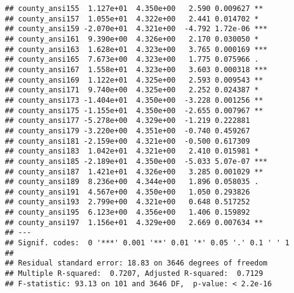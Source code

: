 \documentclass[
]{book}
\newenvironment{Shaded}{\begin{snugshade}}{\end{snugshade}}
\newcommand{\AttributeTok}[1]{\textcolor[rgb]{0.77,0.63,0.00}{#1}}
\newcommand{\FunctionTok}[1]{\textcolor[rgb]{0.00,0.00,0.00}{#1}}
\newcommand{\NormalTok}[1]{#1}
\newcommand{\OtherTok}[1]{\textcolor[rgb]{0.56,0.35,0.01}{#1}}
\newcommand{\SpecialCharTok}[1]{\textcolor[rgb]{0.00,0.00,0.00}{#1}}
\newcommand{\StringTok}[1]{\textcolor[rgb]{0.31,0.60,0.02}{#1}}
\begin{document}
\begin{verbatim}
## county_ansi155  1.127e+01  4.350e+00   2.590 0.009627 ** 
## county_ansi157  1.055e+01  4.322e+00   2.441 0.014702 *  
## county_ansi159 -2.070e+01  4.321e+00  -4.792 1.72e-06 ***
## county_ansi161  9.390e+00  4.326e+00   2.170 0.030050 *  
## county_ansi163  1.628e+01  4.323e+00   3.765 0.000169 ***
## county_ansi165  7.673e+00  4.323e+00   1.775 0.075966 .  
## county_ansi167  1.558e+01  4.323e+00   3.603 0.000318 ***
## county_ansi169  1.122e+01  4.325e+00   2.593 0.009543 ** 
## county_ansi171  9.740e+00  4.325e+00   2.252 0.024387 *  
## county_ansi173 -1.404e+01  4.350e+00  -3.228 0.001256 ** 
## county_ansi175 -1.155e+01  4.350e+00  -2.655 0.007967 ** 
## county_ansi177 -5.278e+00  4.329e+00  -1.219 0.222881    
## county_ansi179 -3.220e+00  4.351e+00  -0.740 0.459267    
## county_ansi181 -2.159e+00  4.321e+00  -0.500 0.617309    
## county_ansi183  1.042e+01  4.321e+00   2.410 0.015981 *  
## county_ansi185 -2.189e+01  4.350e+00  -5.033 5.07e-07 ***
## county_ansi187  1.421e+01  4.326e+00   3.285 0.001029 ** 
## county_ansi189  8.236e+00  4.344e+00   1.896 0.058035 .  
## county_ansi191  4.567e+00  4.350e+00   1.050 0.293826    
## county_ansi193  2.799e+00  4.321e+00   0.648 0.517252    
## county_ansi195  6.123e+00  4.356e+00   1.406 0.159892    
## county_ansi197  1.156e+01  4.329e+00   2.669 0.007634 ** 
## ---
## Signif. codes:  0 '***' 0.001 '**' 0.01 '*' 0.05 '.' 0.1 ' ' 1
## 
## Residual standard error: 18.83 on 3646 degrees of freedom
## Multiple R-squared:  0.7207, Adjusted R-squared:  0.7129 
## F-statistic: 93.13 on 101 and 3646 DF,  p-value: < 2.2e-16
\end{verbatim}

\begin{Shaded}
\end{Shaded}
\end{document}
